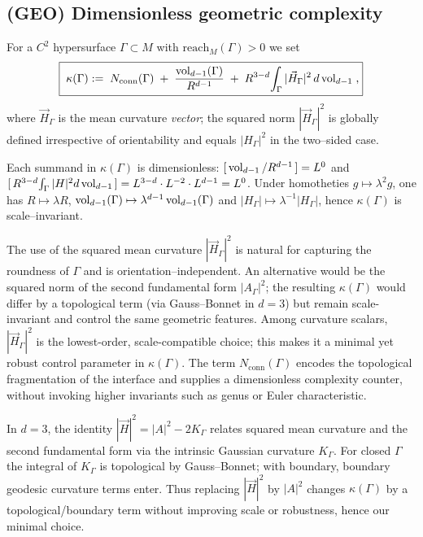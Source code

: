 \subsection{(GEO) Dimensionless geometric complexity}

\begin{definition}\label{def:complexity}
For a $C^2$ hypersurface $\Gamma\subset M$ with $\mathrm{reach}_M(\Gamma)>0$ we set
\[
\boxed{\;
\kappa(\Gamma)
:=\;
N_{\mathrm{conn}}(\Gamma)
\;+\;\frac{\operatorname{vol}_{d-1}(\Gamma)}{R^{d-1}}
\;+\; R^{3-d}\!\int_\Gamma |\vec H_\Gamma|^2\, d\operatorname{vol}_{d-1}\;,
}
\]
where $\vec H_\Gamma$ is the mean curvature \emph{vector}; the squared norm $|\vec H_\Gamma|^2$ is globally defined irrespective of orientability and equals $|H_\Gamma|^2$ in the two–sided case.
\end{definition}

\begin{remark}
Each summand in $\kappa(\Gamma)$ is dimensionless: $[\,\operatorname{vol}_{d-1}/R^{d-1}\,]=L^0$ and
$[\,R^{3-d}\!\int_\Gamma |H|^2 d\operatorname{vol}_{d-1}\,]=L^{3-d}\cdot L^{-2}\cdot L^{d-1}=L^0$.
Under homotheties $g\mapsto \lambda^2 g$, one has $R\mapsto \lambda R$, $\operatorname{vol}_{d-1}(\Gamma)\mapsto \lambda^{d-1}\operatorname{vol}_{d-1}(\Gamma)$ and $|H_\Gamma|\mapsto \lambda^{-1}|H_\Gamma|$, hence $\kappa(\Gamma)$ is scale–invariant.
\end{remark}

\begin{remark}
The use of the squared mean curvature $|\vec H_\Gamma|^2$ is natural for capturing the roundness of $\Gamma$ and is orientation–independent.
An alternative would be the squared norm of the second fundamental form $|A_\Gamma|^2$; the resulting $\kappa(\Gamma)$ would differ by a topological term (via Gauss–Bonnet in $d=3$) but remain scale-invariant and control the same geometric features.
Among curvature scalars, $|\vec H_\Gamma|^2$ is the lowest-order, scale-compatible choice; this makes it a minimal yet robust control parameter in $\kappa(\Gamma)$.
The term $N_{\mathrm{conn}}(\Gamma)$ encodes the topological fragmentation of the interface and supplies a dimensionless complexity counter, without invoking higher invariants such as genus or Euler characteristic.
\end{remark}

\begin{remark}[On $|A_\Gamma|^2$ vs $|\vec H_\Gamma|^2$ in $d=3$]\label{rem:gb-boundary}
In $d=3$, the identity $|\vec H|^2 = |A|^2 - 2K_\Gamma$ relates squared mean curvature and the second fundamental form via the intrinsic Gaussian curvature $K_\Gamma$.
For closed $\Gamma$ the integral of $K_\Gamma$ is topological by Gauss–Bonnet; with boundary, boundary geodesic curvature terms enter.
Thus replacing $|\vec H|^2$ by $|A|^2$ changes $\kappa(\Gamma)$ by a topological/boundary term without improving scale or robustness, hence our minimal choice.
\end{remark}

